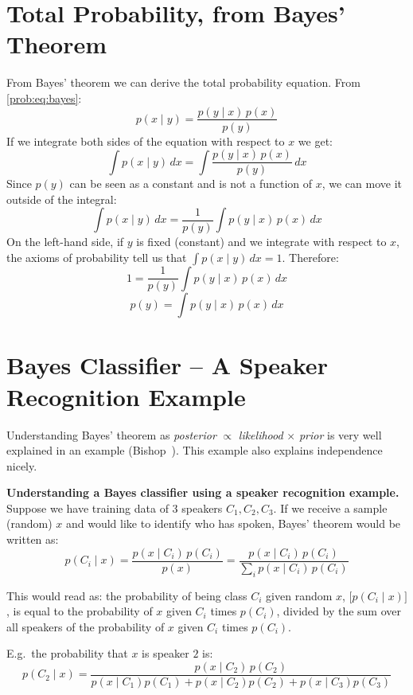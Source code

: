 \section{Total Probability, from Bayes' Theorem}
\label{prob:sec:total-probability}

\noindent
From Bayes' theorem we can derive the total probability equation. From \eqref{prob:eq:bayes}:
\[
p(x\mid y) = \frac{p(y\mid x)\,p(x)}{p(y)}
\]
If we integrate both sides of the equation with respect to $x$ we get:
\[
\int p(x\mid y)\,dx = \int \frac{p(y\mid x)\,p(x)}{p(y)}\,dx
\]
Since $p(y)$ can be seen as a constant and is not a function of $x$, we can move it outside of the integral:
\[
\int p(x\mid y)\,dx = \frac{1}{p(y)} \int p(y\mid x)\,p(x)\,dx
\]
On the left-hand side, if $y$ is fixed (constant) and we integrate with respect to $x$, the axioms of probability tell us that $\int p(x\mid y)\,dx = 1$. Therefore:
\[
1 = \frac{1}{p(y)} \int p(y\mid x)\,p(x)\,dx
\]
\begin{equation}
\boxed{\,p(y) = \int p(y\mid x)\,p(x)\,dx\,}
\label{prob:eq:total-probability}
\end{equation}

\section{Bayes Classifier -- A Speaker Recognition Example}
\label{prob:sec:bayes-classifier}

\noindent
Understanding Bayes' theorem as \emph{posterior} $\propto$ \emph{likelihood} $\times$ \emph{prior} is very well explained in an example (Bishop~\cite[p.~17]{bishop2006prml}). This example also explains independence nicely.

\medskip
\noindent
\textbf{Understanding a Bayes classifier using a speaker recognition example.} Suppose we have training data of $3$ speakers $C_1, C_2, C_3$. If we receive a sample (random) $x$ and would like to identify who has spoken, Bayes' theorem would be written as:
\[
p(C_i\mid x) = \frac{p(x\mid C_i)\,p(C_i)}{p(x)} = \frac{p(x\mid C_i)\,p(C_i)}{\sum_i p(x\mid C_i)\,p(C_i)}
\]

\noindent
This would read as: the probability of being class $C_i$ given random $x$, $\big[p(C_i\mid x)\big]$, is equal to the probability of $x$ given $C_i$ times $p(C_i)$, divided by the sum over all speakers of the probability of $x$ given $C_i$ times $p(C_i)$.

\medskip
\noindent
E.g.\ the probability that $x$ is speaker $2$ is:
\[
p(C_2\mid x) = \frac{p(x\mid C_2)\,p(C_2)}{p(x\mid C_1)p(C_1) + p(x\mid C_2)p(C_2) + p(x\mid C_3)p(C_3)}
\]

